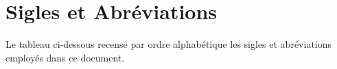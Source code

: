 \documentclass[12pt, a4paper]{report}
\begin{document}
\clearpage

\chapter*{Sigles et Abréviations}

\noindent
Le tableau ci-dessous recense par ordre alphabétique les sigles et abréviations
employés dans ce document.

\vspace{4pt}

\begingroup
{}
\renewcommand{\arraystretch}{1.12}
\noindent
\end{document}
